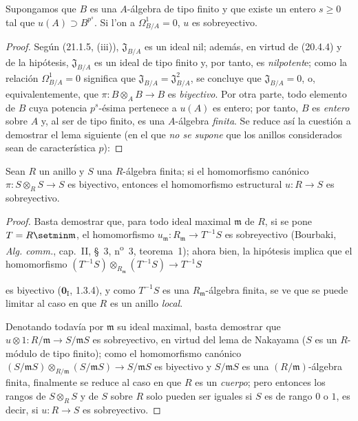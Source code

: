 \begin{corollary}[21.1.6]
\label{0.21.1.6-fr}
Supongamos que $B$ es una $A$-álgebra de tipo finito y que existe un entero
$s\geq0$ tal que $u(A)\supset B^{p^s}$. Si l'on a $\Omega^1_{B/A}=0$, $u$ es
sobreyectivo.
\end{corollary}

\begin{proof}

Según (21.1.5, (iii)), $\mathfrak J_{B/A}$ es un ideal nil; además, en
virtud de (20.4.4) y de la hipótesis, $\mathfrak J_{B/A}$ es un ideal de tipo
finito y, por tanto, es \emph{nilpotent}e; como la relación $\Omega^1_{B/A}=0$
significa que $\mathfrak J_{B/A}=\mathfrak J_{B/A}^2$, se concluye que
$\mathfrak J_{B/A}=0$, o, equivalentemente, que
$\pi:B\otimes_A B\to B$ es \emph{biyectivo}.
Por otra parte, todo elemento de $B$ cuya potencia $p^s$-ésima pertenece a
$u(A)$ es entero; por tanto, $B$ es \emph{entero} sobre $A$ y, al ser de tipo finito,
es una $A$-álgebra \emph{finita}. Se reduce así la cuestión a demostrar el lema
siguiente (en el que \emph{no
se supone} que los anillos considerados sean de característica $p$):
\end{proof}

\begin{lemma}[21.1.6.1]
\label{0.21.1.6.1-fr}
Sean $R$ un anillo y $S$ una $R$-álgebra finita; si el homomorfismo canónico
$\pi:S\otimes_R S\to S$ es biyectivo, entonces el homomorfismo estructural
$u:R\to S$ es sobreyectivo.
\end{lemma}

\begin{proof}
Basta demostrar que, para todo ideal maximal $\mathfrak m$ de $R$, si se
pone $T=R\setmin\mathfrak m$, el homomorfismo
$u_{\mathfrak m}:R_{\mathfrak m}\to T^{-1}S$ es sobreyectivo (Bourbaki,
\emph{Alg. comm.}, cap.~II, §~3, n\textsuperscript{o}~3, teorema~1); ahora bien, la
hipótesis implica que el homomorfismo
$(T^{-1}S)\otimes_{R_{\mathfrak m}}(T^{-1}S)\to T^{-1}S$

es biyectivo ($\mathbf{0}_{\mathrm I}$, 1.3.4), y como $T^{-1}S$ es una
$R_{\mathfrak m}$-álgebra finita, se ve que se puede limitar al caso en
que $R$ es un anillo \emph{local}.

Denotando todavía por $\mathfrak m$ su ideal maximal, basta demostrar que
$u\otimes1:R/\mathfrak m\to S/\mathfrak mS$ es sobreyectivo, en virtud del
lema de Nakayama ($S$ es un $R$-módulo de tipo finito); como el homomorfismo
canónico
$(S/\mathfrak mS)\otimes_{R/\mathfrak m}(S/\mathfrak mS)\to S/\mathfrak mS$
es biyectivo y $S/\mathfrak mS$ es una $(R/\mathfrak m)$-álgebra finita,
finalmente se reduce al caso en que $R$ es un \emph{cuerpo}; pero entonces los
rangos de $S\otimes_R S$ y de $S$ sobre $R$ solo pueden ser iguales si $S$
es de rango $0$ o $1$, es decir, si $u:R\to S$ es sobreyectivo.
\end{proof}

